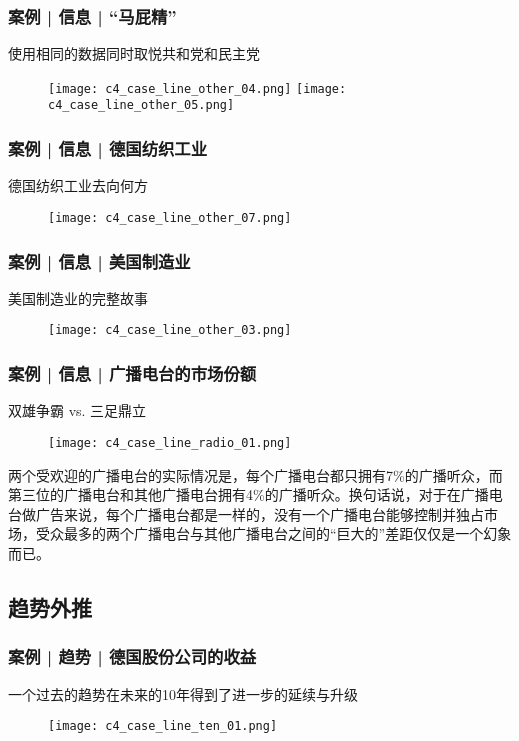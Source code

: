 \begin{frame}
  \frametitle{案例 | 信息 | “马屁精”}
  \begin{block}{使用相同的数据同时取悦共和党和民主党}
    \begin{figure}
      \centering
      \texttt{[image: c4\_case\_line\_other\_04.png]}\quad
      \texttt{[image: c4\_case\_line\_other\_05.png]}
    \end{figure}
  \end{block}
\end{frame}

\begin{frame}
  \frametitle{案例 | 信息 | 德国纺织工业}
  \begin{block}{德国纺织工业去向何方}
    \begin{figure}
      \centering
      \texttt{[image: c4\_case\_line\_other\_07.png]}
    \end{figure}
  \end{block}
\end{frame}

\begin{frame}
  \frametitle{案例 | 信息 | 美国制造业}
  \begin{block}{美国制造业的完整故事}
    \begin{figure}
      \centering
      \texttt{[image: c4\_case\_line\_other\_03.png]}
    \end{figure}
  \end{block}
\end{frame}

\begin{frame}
  \frametitle{案例 | 信息 | 广播电台的市场份额}
  \begin{block}{双雄争霸 vs. 三足鼎立}
    \begin{figure}
      \centering
      \texttt{[image: c4\_case\_line\_radio\_01.png]}
    \end{figure}
    \vspace{-1em}
    \pause
两个受欢迎的广播电台的实际情况是，每个广播电台都只拥有7\%的广播听众，而第三位的广播电台和其他广播电台拥有4\%的广播听众。换句话说，对于在广播电台做广告来说，每个广播电台都是一样的，没有一个广播电台能够控制并独占市场，受众最多的两个广播电台与其他广播电台之间的“巨大的”差距仅仅是一个幻象而已。
  \end{block}
\end{frame}

\subsection{趋势外推}
\begin{frame}
  \frametitle{案例 | 趋势 | 德国股份公司的收益}
  \begin{block}{一个过去的趋势在未来的10年得到了进一步的延续与升级}
    \begin{figure}
      \centering
      \texttt{[image: c4\_case\_line\_ten\_01.png]}
    \end{figure}
  \end{block}
\end{frame}

